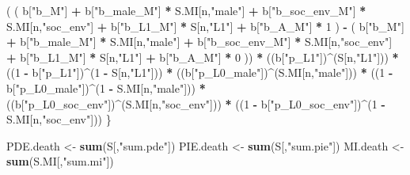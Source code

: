 \documentclass[
]{book}
\newenvironment{Shaded}{\begin{snugshade}}{\end{snugshade}}
\newcommand{\DecValTok}[1]{\textcolor[rgb]{0.00,0.00,0.81}{#1}}
\newcommand{\FunctionTok}[1]{\textcolor[rgb]{0.13,0.29,0.53}{\textbf{#1}}}
\newcommand{\NormalTok}[1]{#1}
\newcommand{\OtherTok}[1]{\textcolor[rgb]{0.56,0.35,0.01}{#1}}
\newcommand{\SpecialCharTok}[1]{\textcolor[rgb]{0.81,0.36,0.00}{\textbf{#1}}}
\newcommand{\StringTok}[1]{\textcolor[rgb]{0.31,0.60,0.02}{#1}}
\begin{document}
\begin{Shaded}
\begin{Highlighting}[]
\NormalTok{      ( ( b[}\StringTok{"b\_M"}\NormalTok{] }\SpecialCharTok{+} 
\NormalTok{            b[}\StringTok{"b\_male\_M"}\NormalTok{] }\SpecialCharTok{*}\NormalTok{ S.MI[n,}\StringTok{"male"}\NormalTok{] }\SpecialCharTok{+} 
\NormalTok{            b[}\StringTok{"b\_soc\_env\_M"}\NormalTok{] }\SpecialCharTok{*}\NormalTok{ S.MI[n,}\StringTok{"soc\_env"}\NormalTok{] }\SpecialCharTok{+} 
\NormalTok{            b[}\StringTok{"b\_L1\_M"}\NormalTok{] }\SpecialCharTok{*}\NormalTok{ S[n,}\StringTok{"L1"}\NormalTok{] }\SpecialCharTok{+}
\NormalTok{            b[}\StringTok{"b\_A\_M"}\NormalTok{] }\SpecialCharTok{*} \DecValTok{1}\NormalTok{ ) }\SpecialCharTok{{-}} 
\NormalTok{          ( b[}\StringTok{"b\_M"}\NormalTok{] }\SpecialCharTok{+} 
\NormalTok{              b[}\StringTok{"b\_male\_M"}\NormalTok{] }\SpecialCharTok{*}\NormalTok{ S.MI[n,}\StringTok{"male"}\NormalTok{] }\SpecialCharTok{+} 
\NormalTok{              b[}\StringTok{"b\_soc\_env\_M"}\NormalTok{] }\SpecialCharTok{*}\NormalTok{ S.MI[n,}\StringTok{"soc\_env"}\NormalTok{] }\SpecialCharTok{+} 
\NormalTok{              b[}\StringTok{"b\_L1\_M"}\NormalTok{] }\SpecialCharTok{*}\NormalTok{ S[n,}\StringTok{"L1"}\NormalTok{] }\SpecialCharTok{+}
\NormalTok{              b[}\StringTok{"b\_A\_M"}\NormalTok{] }\SpecialCharTok{*} \DecValTok{0}\NormalTok{ )) }\SpecialCharTok{*} 
\NormalTok{      ((b[}\StringTok{"p\_L1"}\NormalTok{])}\SpecialCharTok{\^{}}\NormalTok{(S[n,}\StringTok{"L1"}\NormalTok{])) }\SpecialCharTok{*}
\NormalTok{      ((}\DecValTok{1} \SpecialCharTok{{-}}\NormalTok{ b[}\StringTok{"p\_L1"}\NormalTok{])}\SpecialCharTok{\^{}}\NormalTok{(}\DecValTok{1} \SpecialCharTok{{-}}\NormalTok{ S[n,}\StringTok{"L1"}\NormalTok{])) }\SpecialCharTok{*}
\NormalTok{      ((b[}\StringTok{"p\_L0\_male"}\NormalTok{])}\SpecialCharTok{\^{}}\NormalTok{(S.MI[n,}\StringTok{"male"}\NormalTok{])) }\SpecialCharTok{*} 
\NormalTok{      ((}\DecValTok{1} \SpecialCharTok{{-}}\NormalTok{ b[}\StringTok{"p\_L0\_male"}\NormalTok{])}\SpecialCharTok{\^{}}\NormalTok{(}\DecValTok{1} \SpecialCharTok{{-}}\NormalTok{ S.MI[n,}\StringTok{"male"}\NormalTok{])) }\SpecialCharTok{*} 
\NormalTok{      ((b[}\StringTok{"p\_L0\_soc\_env"}\NormalTok{])}\SpecialCharTok{\^{}}\NormalTok{(S.MI[n,}\StringTok{"soc\_env"}\NormalTok{])) }\SpecialCharTok{*}
\NormalTok{      ((}\DecValTok{1} \SpecialCharTok{{-}}\NormalTok{ b[}\StringTok{"p\_L0\_soc\_env"}\NormalTok{])}\SpecialCharTok{\^{}}\NormalTok{(}\DecValTok{1} \SpecialCharTok{{-}}\NormalTok{ S.MI[n,}\StringTok{"soc\_env"}\NormalTok{])) }
\NormalTok{    \}}
  
\NormalTok{  PDE.death }\OtherTok{\textless{}{-}} \FunctionTok{sum}\NormalTok{(S[,}\StringTok{"sum.pde"}\NormalTok{])}
\NormalTok{  PIE.death }\OtherTok{\textless{}{-}} \FunctionTok{sum}\NormalTok{(S[,}\StringTok{"sum.pie"}\NormalTok{])}
\NormalTok{  MI.death }\OtherTok{\textless{}{-}} \FunctionTok{sum}\NormalTok{(S.MI[,}\StringTok{"sum.mi"}\NormalTok{])}
  

\end{Highlighting}
\end{Shaded}
\end{document}
